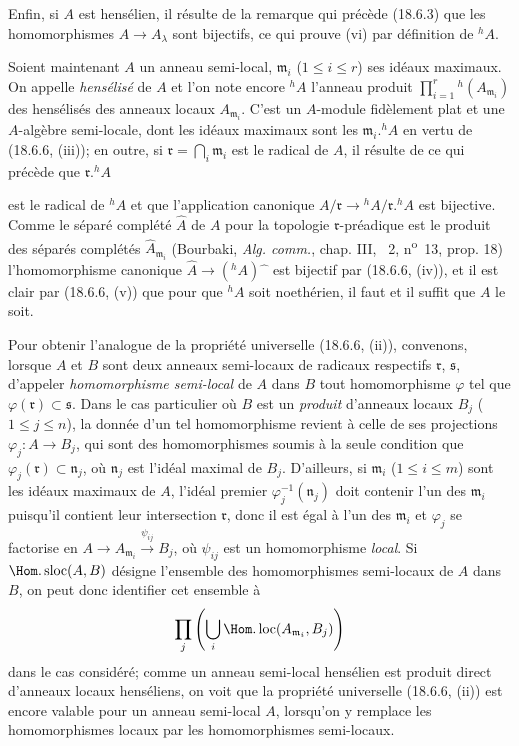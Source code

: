 Enfin, si $A$ est hensélien, il résulte de la remarque qui précède (18.6.3) que les homomorphismes $A\to A_\lambda$ sont bijectifs, ce qui prouve (vi) par définition de ${}^h\!A$.

\begin{env}[18.6.7]
Soient maintenant $A$ un anneau semi-local, $\mathfrak m_i$ ($1\leq i\leq r$) ses idéaux maximaux. On appelle \emph{hensélisé} de $A$ et l'on note encore ${}^h\!A$ l'anneau produit $\prod_{i=1}^r{}^h(A_{\mathfrak m_i})$ des hensélisés des anneaux locaux $A_{\mathfrak m_i}$. C'est un $A$-module fidèlement plat et une $A$-algèbre semi-locale, dont les idéaux maximaux sont les $\mathfrak m_i.{}^h\!A$ en vertu de (18.6.6, (iii)); en outre, si $\mathfrak r=\bigcap_i\mathfrak m_i$ est le radical de $A$, il résulte de ce qui précède que $\mathfrak r.{}^h\!A$


est le radical de ${}^h\!A$ et que l'application canonique $A/\mathfrak r\to{}^h\!A/\mathfrak r.{}^h\!A$ est bijective. Comme le séparé complété $\widehat A$ de $A$ pour la topologie $\mathfrak r$-préadique est le produit des séparés complétés $\widehat A_{\mathfrak m_i}$ (Bourbaki, \emph{Alg. comm.}, chap. III, \textsection~2, n\textsuperscript{o}~13, prop. 18) l'homomorphisme canonique $\widehat A\to({}^h\!A)\widehat{\phantom{x}}$ est bijectif par (18.6.6, (iv)), et il est clair par (18.6.6, (v)) que pour que ${}^h\!A$ soit noethérien, il faut et il suffit que $A$ le soit.

Pour obtenir l'analogue de la propriété universelle (18.6.6, (ii)), convenons, lorsque $A$ et $B$ sont deux anneaux semi-locaux de radicaux respectifs $\mathfrak r$, $\mathfrak s$, d'appeler \emph{homomorphisme semi-local} de $A$ dans $B$ tout homomorphisme $\varphi$ tel que $\varphi(\mathfrak r)\subset\mathfrak s$. Dans le cas particulier où $B$ est un \emph{produit} d'anneaux locaux $B_j$ ($1\leq j\leq n$), la donnée d'un tel homomorphisme revient à celle de ses projections $\varphi_j:A\to B_j$, qui sont des homomorphismes soumis à la seule condition que $\varphi_j(\mathfrak r)\subset\mathfrak n_j$, où $\mathfrak n_j$ est l'idéal maximal de $B_j$. D'ailleurs, si $\mathfrak m_i$ ($1\leq i\leq m$) sont les idéaux maximaux de $A$, l'idéal premier $\varphi_j^{-1}(\mathfrak n_j)$ doit contenir l'un des $\mathfrak m_i$ puisqu'il contient leur intersection $\mathfrak r$, donc il est égal à l'un des $\mathfrak m_i$ et $\varphi_j$ se factorise en $A\to A_{\mathfrak m_i}\xrightarrow{\psi_{ij}}B_j$, où $\psi_{ij}$ est un homomorphisme \emph{local}. Si $\Hom.\operatorname{sloc}(A,B)$ désigne l'ensemble des homomorphismes semi-locaux de $A$ dans $B$, on peut donc identifier cet ensemble à
\[
  \prod_j\left(\bigcup_i\Hom.\operatorname{loc}(A_{\mathfrak m_i},B_j)\right)
\]
dans le cas considéré; comme un anneau semi-local hensélien est produit direct d'anneaux locaux henséliens, on voit que la propriété universelle (18.6.6, (ii)) est encore valable pour un anneau semi-local $A$, lorsqu'on y remplace les homomorphismes locaux par les homomorphismes semi-locaux.
\end{env}

